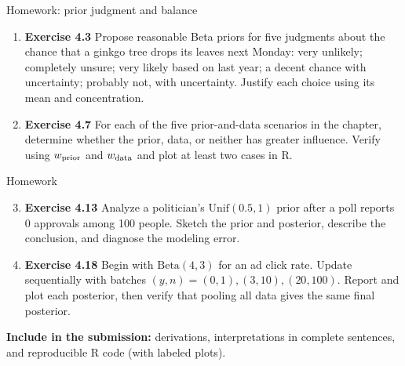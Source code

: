 \documentclass[aspectratio=43,11pt]{beamer}
\begin{document}
\begin{frame}{Homework: prior judgment and balance}
\begin{enumerate}
  \item \textbf{Exercise 4.3} Propose reasonable Beta priors for five judgments about the chance that a ginkgo tree drops its leaves next Monday: very unlikely; completely unsure; very likely based on last year; a decent chance with uncertainty; probably not, with uncertainty. Justify each choice using its mean and concentration.
  \item \textbf{Exercise 4.7} For each of the five prior-and-data scenarios in the chapter, determine whether the prior, data, or neither has greater influence. Verify using $w_{\rm prior}$ and $w_{\rm data}$ and plot at least two cases in R.
\end{enumerate}
\end{frame}

\begin{frame}{Homework}
\begin{enumerate}\setcounter{enumi}{2}
  \item \textbf{Exercise 4.13} Analyze a politician's $\mathrm{Unif}(0.5,1)$ prior after a poll reports 0 approvals among 100 people. Sketch the prior and posterior, describe the conclusion, and diagnose the modeling error.
  \item \textbf{Exercise 4.18} Begin with $\mathrm{Beta}(4,3)$ for an ad click rate. Update sequentially with batches $(y,n)=(0,1),(3,10),(20,100)$. Report and plot each posterior, then verify that pooling all data gives the same final posterior.
\end{enumerate}
\vspace{.5em}
\textbf{Include in the submission:} derivations, interpretations in complete sentences, and reproducible R code (with labeled plots).
\end{frame}
\end{document}
